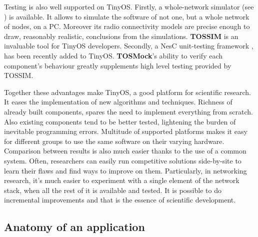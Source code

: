 Testing is also well supported on TinyOS. Firstly, a whole-network
simulator (see \cite{TOSSIM}) is available. It allows to simulate the
software of not one, but a whole network of nodes, on a PC. Moreover
its radio connectivity models are precise enough to draw, reasonably
realistic, conclusions from the simulations. {\bf TOSSIM} is an
invaluable tool for TinyOS developers. Secondly, a NesC unit-testing
framework \cite{TOSMock}, has been recently added to TinyOS. {\bf
TOSMock}'s ability to verify each component's behaviour greatly
supplements high level testing provided by TOSSIM.

Together these advantages make TinyOS, a good platform for scientific
research. It eases the implementation of new algorithms and
techniques.  Richness of already built components, spares the need to
implement everything from scratch.  Also existing components tend to
be better tested, lightening the burden of inevitable programming
errors.  Multitude of supported platforms makes it easy for different
groups to use the same software on their varying hardware.  Comparison
between results is also much easier thanks to the use of a common
system.  Often, researchers can easily run competitive solutions
side-by-site to learn their flaws and find ways to improve on them.
Particularly, in networking research, it's much easier to experiment
with a single element of the network stack, when all the rest of it is
available and tested. It is possible to do incremental improvements
and that is the essence of scientific development.

\subsection{Anatomy of an application}

